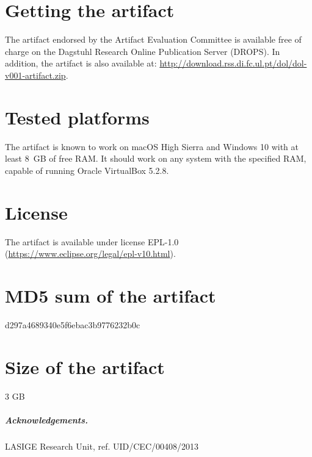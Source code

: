 \documentclass[a4paper,UKenglish]{darts-v2018}
\newenvironment{getting}{\section{Getting the artifact} The artifact 
endorsed by the Artifact Evaluation Committee is available free of 
charge on the Dagstuhl Research Online Publication Server (DROPS).}{}
\newenvironment{platforms}{\section{Tested platforms}}{}
\newcommand{\license}[1]{{\section{License}#1}}
\newcommand{\mdsum}[1]{{\section{MD5 sum of the artifact}#1}}
\newcommand{\artifactsize}[1]{{\section{Size of the artifact}#1}}
\begin{document}
\begin{getting}
In addition, the artifact is also available at:
\url{http://download.rss.di.fc.ul.pt/dol/dol-v001-artifact.zip}.
\end{getting}

\begin{platforms}
The artifact is known to work on macOS High Sierra and Windows 10 with at least
8~GB of free RAM. It should work on any system with the specified RAM, capable
of running Oracle VirtualBox  5.2.8.
\end{platforms}

\license{The artifact is available under license EPL-1.0
(\url{https://www.eclipse.org/legal/epl-v10.html}).}

\mdsum{d297a4689340e5f6ebac3b9776232b0c}

\artifactsize{3 GB}

\subparagraph*{Acknowledgements.}
LASIGE Research Unit, ref. UID/CEC/00408/2013
\end{document}
